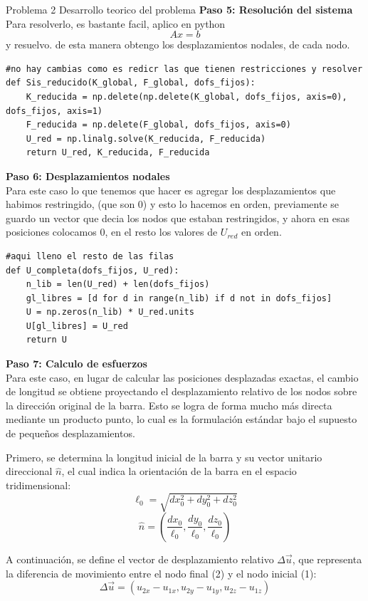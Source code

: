 \begin{desarrollo}{Problema 2 Desarrollo teorico del problema}
\textbf{Paso 5: Resolución del sistema}\\
Para resolverlo, es bastante facil, aplico en python 
$$Ax=b$$ y resuelvo. de esta manera obtengo los desplazamientos nodales, de cada nodo.\\
\begin{lstlisting}[style=pythonstyle, caption={Reducción del sistema y resolución de desplazamientos}, label={lst:sis_reducido}]
#no hay cambias como es redicr las que tienen restricciones y resolver
def Sis_reducido(K_global, F_global, dofs_fijos):
    K_reducida = np.delete(np.delete(K_global, dofs_fijos, axis=0), dofs_fijos, axis=1)
    F_reducida = np.delete(F_global, dofs_fijos, axis=0)
    U_red = np.linalg.solve(K_reducida, F_reducida)
    return U_red, K_reducida, F_reducida
\end{lstlisting}
\textbf{Paso 6: Desplazamientos nodales}\\
Para este caso lo que tenemos que hacer es agregar los desplazamientos que habimos restringido, (que son 0) y esto lo hacemos en orden, previamente se guardo un vector que decia los nodos que estaban restringidos, y ahora en esas posiciones colocamos 0, en el resto los valores de $U_{red}$ en orden.\\
\begin{lstlisting}[style=pythonstyle, caption={Reconstrucción del vector de desplazamientos completo}, label={lst:u_completa}]
#aqui lleno el resto de las filas
def U_completa(dofs_fijos, U_red):
    n_lib = len(U_red) + len(dofs_fijos)
    gl_libres = [d for d in range(n_lib) if d not in dofs_fijos]
    U = np.zeros(n_lib) * U_red.units
    U[gl_libres] = U_red
    return U
\end{lstlisting}
\textbf{Paso 7: Calculo de esfuerzos}\\
Para este caso, en lugar de calcular las posiciones desplazadas exactas, el cambio de longitud se obtiene proyectando el desplazamiento relativo de los nodos sobre la dirección original de la barra. Esto se logra de forma mucho más directa mediante un producto punto, lo cual es la formulación estándar bajo el supuesto de pequeños desplazamientos.

Primero, se determina la longitud inicial de la barra y su vector unitario direccional $\hat{n}$, el cual indica la orientación de la barra en el espacio tridimensional:
$$\ell_0 = \sqrt{dx_0^2 + dy_0^2 + dz_0^2}$$
$$\hat{n} = \left( \dfrac{dx_0}{\ell_0}, \dfrac{dy_0}{\ell_0}, \dfrac{dz_0}{\ell_0} \right)$$

A continuación, se define el vector de desplazamiento relativo $\Delta \vec{u}$, que representa la diferencia de movimiento entre el nodo final (2) y el nodo inicial (1):
$$\Delta \vec{u} = \left( u_{2x} - u_{1x}, u_{2y} - u_{1y}, u_{2z} - u_{1z} \right)$$


\end{desarrollo}
